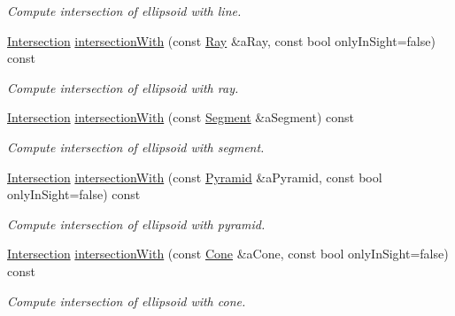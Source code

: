 \begin{DoxyCompactItemize}
\begin{DoxyCompactList}\small\item\em Compute intersection of ellipsoid with line. \end{DoxyCompactList}\item 
\hyperlink{classlibrary_1_1math_1_1geom_1_1d3_1_1_intersection}{Intersection} \hyperlink{classlibrary_1_1math_1_1geom_1_1d3_1_1objects_1_1_ellipsoid_a2a7c282ac6d4b54210582953e37c8ab5}{intersection\+With} (const \hyperlink{classlibrary_1_1math_1_1geom_1_1d3_1_1objects_1_1_ray}{Ray} \&a\+Ray, const bool only\+In\+Sight=false) const
\begin{DoxyCompactList}\small\item\em Compute intersection of ellipsoid with ray. \end{DoxyCompactList}\item 
\hyperlink{classlibrary_1_1math_1_1geom_1_1d3_1_1_intersection}{Intersection} \hyperlink{classlibrary_1_1math_1_1geom_1_1d3_1_1objects_1_1_ellipsoid_a28ba552ce19297c754a7ca17430c5716}{intersection\+With} (const \hyperlink{classlibrary_1_1math_1_1geom_1_1d3_1_1objects_1_1_segment}{Segment} \&a\+Segment) const
\begin{DoxyCompactList}\small\item\em Compute intersection of ellipsoid with segment. \end{DoxyCompactList}\item 
\hyperlink{classlibrary_1_1math_1_1geom_1_1d3_1_1_intersection}{Intersection} \hyperlink{classlibrary_1_1math_1_1geom_1_1d3_1_1objects_1_1_ellipsoid_a84b3e80768ab52ba5c3b538eda77583c}{intersection\+With} (const \hyperlink{classlibrary_1_1math_1_1geom_1_1d3_1_1objects_1_1_pyramid}{Pyramid} \&a\+Pyramid, const bool only\+In\+Sight=false) const
\begin{DoxyCompactList}\small\item\em Compute intersection of ellipsoid with pyramid. \end{DoxyCompactList}\item 
\hyperlink{classlibrary_1_1math_1_1geom_1_1d3_1_1_intersection}{Intersection} \hyperlink{classlibrary_1_1math_1_1geom_1_1d3_1_1objects_1_1_ellipsoid_a65d88f22d1eb931021ec78eda96055af}{intersection\+With} (const \hyperlink{classlibrary_1_1math_1_1geom_1_1d3_1_1objects_1_1_cone}{Cone} \&a\+Cone, const bool only\+In\+Sight=false) const
\begin{DoxyCompactList}\small\item\em Compute intersection of ellipsoid with cone. \end{DoxyCompactList}\item 

\end{DoxyCompactItemize}
